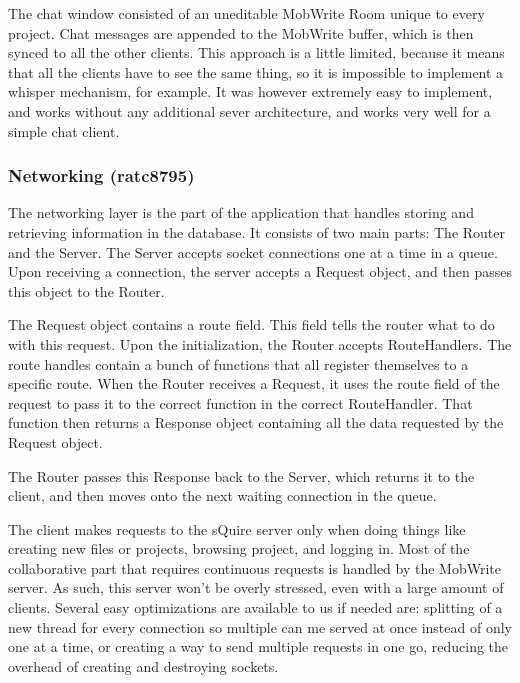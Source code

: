 \documentclass[twoside,letterpaper]{article}
\begin{document}
The chat window consisted of an uneditable MobWrite Room unique to every project. Chat messages are appended to the MobWrite buffer, which is then synced to all the other clients. This approach is a little limited, because it means that all the clients have to see the same thing, so it is impossible to implement a whisper mechanism, for example. It was however extremely easy to implement, and works without any additional sever architecture, and works very well for a simple chat client.

\subsubsection{Networking (ratc8795)}
The networking layer is the part of the application that handles storing and retrieving information in the database. It consists of two main parts: The Router and the Server. The Server accepts socket connections one at a time in a queue. Upon receiving a connection, the server accepts a Request object, and then passes this object to the Router.

The Request object contains a route field. This field tells the router what to do with this request. Upon the initialization, the Router accepts RouteHandlers. The route handles contain a bunch of functions that all register themselves to a specific route. When the Router receives a Request, it uses the route field of the request to pass it to the correct function in the correct RouteHandler. That function then returns a Response object containing all the data requested by the Request object.

The Router passes this Response back to the Server, which returns it to the client, and then moves onto the next waiting connection in the queue.

The client makes requests to the sQuire server only when doing things like creating new files or projects, browsing project, and logging in. Most of the collaborative part that requires continuous requests is handled by the MobWrite server. As such, this server won't be overly stressed, even with a large amount of clients. Several easy optimizations are available to us if needed are: splitting of a new thread for every connection so multiple can me served at once instead of only one at a time, or creating a way to send multiple requests in one go, reducing the overhead of creating and destroying sockets.
\end{document}
